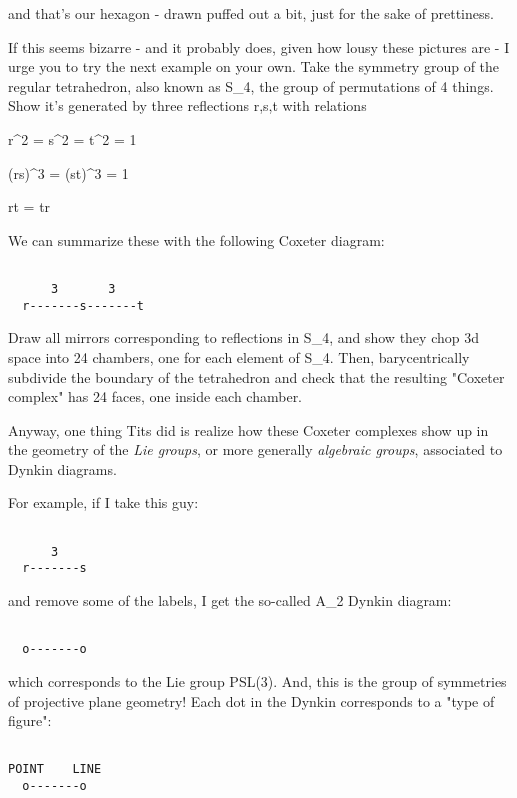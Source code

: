 and that's our hexagon - drawn puffed out a bit, just for the sake
of prettiness.

If this seems bizarre - and it probably does, given how lousy these
pictures are - I urge you to try the next example on your own.  Take
the symmetry group of the regular tetrahedron, also known as S_{4},
the group of permutations of 4 things.  Show it's generated by 
three reflections r,s,t with relations

r^{2} = s^{2} = t^{2} = 1

(rs)^{3} = (st)^{3} = 1

rt = tr

We can summarize these with the following Coxeter diagram:


\begin{verbatim}

      3       3
  r-------s-------t
\end{verbatim}
    
Draw all mirrors corresponding to reflections in S_{4}, and show 
they chop 3d space into 24 chambers, one for each element of S_{4}. 
Then, barycentrically subdivide the boundary of the tetrahedron 
and check that the resulting "Coxeter complex" has 24 faces, one 
inside each chamber.

Anyway, one thing Tits did is realize how these Coxeter complexes 
show up in the geometry of the \emph{Lie groups}, or more generally
\emph{algebraic groups}, associated to Dynkin diagrams.  

For example, if I take this guy:


\begin{verbatim}

      3
  r-------s
\end{verbatim}
    

and remove some of the labels, I get the so-called A_{2}
Dynkin diagram:


\begin{verbatim}

  o-------o
\end{verbatim}
    
which corresponds to the Lie group PSL(3).  And, this is the group 
of symmetries of projective plane geometry!  Each dot in the Dynkin
corresponds to a "type of figure":


\begin{verbatim}

POINT    LINE
  o-------o
\end{verbatim}
    
